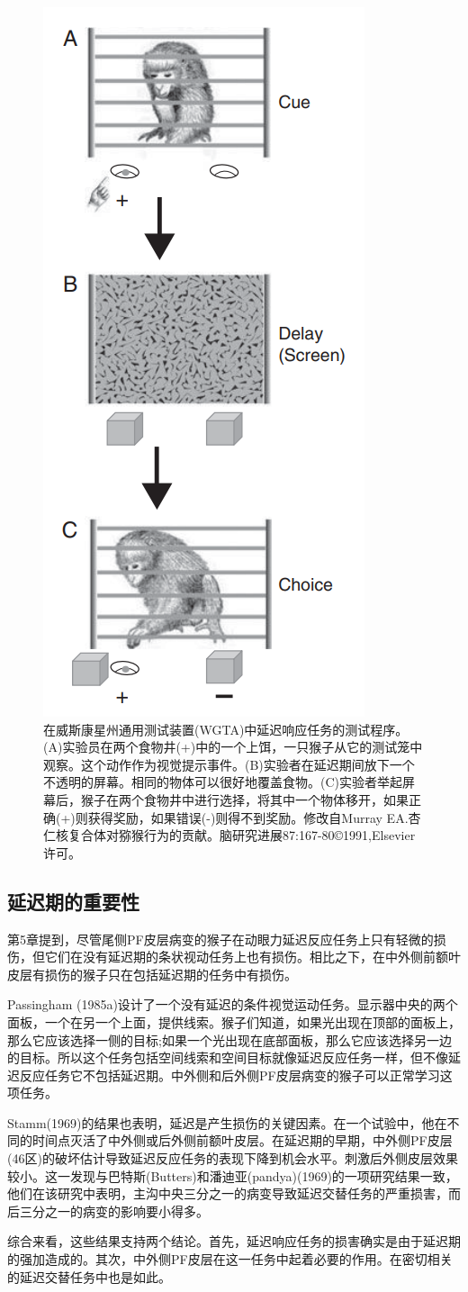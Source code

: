 \begin{figure}
	\centering
	\includegraphics[width=0.2\linewidth]{image_pfc/Fig_6_3}
	\caption{在威斯康星州通用测试装置(WGTA)中延迟响应任务的测试程序。(A)实验员在两个食物井(+)中的一个上饵，一只猴子从它的测试笼中观察。这个动作作为视觉提示事件。(B)实验者在延迟期间放下一个不透明的屏幕。相同的物体可以很好地覆盖食物。(C)实验者举起屏幕后，猴子在两个食物井中进行选择，将其中一个物体移开，如果正确(+)则获得奖励，如果错误(-)则得不到奖励。修改自Murray EA.杏仁核复合体对猕猴行为的贡献。脑研究进展87:167-80©1991,Elsevier许可。}
	\label{fig:fig}
\end{figure}
\subsection{延迟期的重要性}
第5章提到，尽管尾侧PF皮层病变的猴子在动眼力延迟反应任务上只有轻微的损伤，但它们在没有延迟期的条状视动任务上也有损伤。相比之下，在中外侧前额叶皮层有损伤的猴子只在包括延迟期的任务中有损伤。

Passingham (1985a)设计了一个没有延迟的条件视觉运动任务。显示器中央的两个面板，一个在另一个上面，提供线索。猴子们知道，如果光出现在顶部的面板上，那么它应该选择一侧的目标;如果一个光出现在底部面板，那么它应该选择另一边的目标。所以这个任务包括空间线索和空间目标就像延迟反应任务一样，但不像延迟反应任务它不包括延迟期。中外侧和后外侧PF皮层病变的猴子可以正常学习这项任务。

Stamm(1969)的结果也表明，延迟是产生损伤的关键因素。在一个试验中，他在不同的时间点灭活了中外侧或后外侧前额叶皮层。在延迟期的早期，中外侧PF皮层(46区)的破坏估计导致延迟反应任务的表现下降到机会水平。刺激后外侧皮层效果较小。这一发现与巴特斯(Butters)和潘迪亚(pandya)(1969)的一项研究结果一致，他们在该研究中表明，主沟中央三分之一的病变导致延迟交替任务的严重损害，而后三分之一的病变的影响要小得多。

综合来看，这些结果支持两个结论。首先，延迟响应任务的损害确实是由于延迟期的强加造成的。其次，中外侧PF皮层在这一任务中起着必要的作用。在密切相关的延迟交替任务中也是如此。
